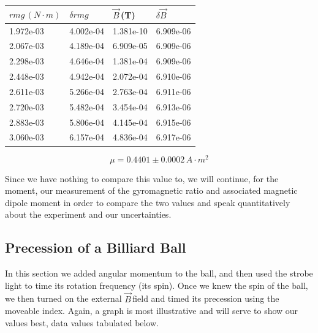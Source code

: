 \documentclass{article}
\newcommand{\B}{$\vec{B}\,$}
\begin{document}
	\begin{center}
	\begin{tabular}{|l|l|l|l|}
		\hline
		$rmg \, (N \cdot m)$ & $\delta rmg$ & \B (T)& $\delta$\B \\
		\hline
		1.972e-03 & 4.002e-04 & 1.381e-10 & 6.909e-06 \\
		2.067e-03 & 4.189e-04 & 6.909e-05 & 6.909e-06 \\
		2.298e-03 & 4.646e-04 & 1.381e-04 & 6.909e-06 \\
		2.448e-03 & 4.942e-04 & 2.072e-04 & 6.910e-06 \\
		2.611e-03 & 5.266e-04 & 2.763e-04 & 6.911e-06 \\
		2.720e-03 & 5.482e-04 & 3.454e-04 & 6.913e-06 \\
		2.883e-03 & 5.806e-04 & 4.145e-04 & 6.915e-06 \\
		3.060e-03 & 6.157e-04 & 4.836e-04 & 6.917e-06 \\
		\hline
	\end{tabular}
	\end{center}

	$$\boxed{\mu = 0.4401 \pm 0.0002 \, A \cdot m^2}$$

	Since we have nothing to compare this value to, we will continue, for the moment, our measurement of the gyromagnetic ratio and associated magnetic dipole moment in order to compare the two values and speak quantitatively about the experiment and our uncertainties.

	\subsection{Precession of a Billiard Ball}
	In this section we added angular momentum to the ball, and then used the strobe light to time its rotation frequency (its spin).  Once we knew the spin of the ball, we then turned on the external \B field and timed its precession using the moveable index.  Again, a graph is most illustrative and will serve to show our values best, data values tabulated below.
\end{document}
